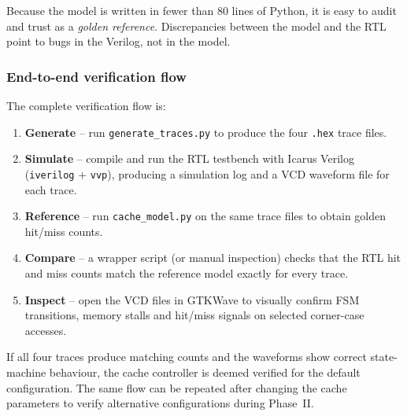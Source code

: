Because the model is written in fewer than 80 lines of Python, it is easy
to audit and trust as a \emph{golden reference}.  Discrepancies between
the model and the RTL point to bugs in the Verilog, not in the model.

\subsubsection{End-to-end verification flow}
The complete verification flow is:
\begin{enumerate}
  \item \textbf{Generate} -- run \texttt{generate\_traces.py} to produce
        the four \texttt{.hex} trace files.
  \item \textbf{Simulate} -- compile and run the RTL testbench with Icarus
        Verilog (\texttt{iverilog} + \texttt{vvp}), producing a simulation
        log and a VCD waveform file for each trace.
  \item \textbf{Reference} -- run \texttt{cache\_model.py} on the same
        trace files to obtain golden hit/miss counts.
  \item \textbf{Compare} -- a wrapper script (or manual inspection)
        checks that the RTL hit and miss counts match the reference model
        exactly for every trace.
  \item \textbf{Inspect} -- open the VCD files in GTKWave to visually
        confirm FSM transitions, memory stalls and hit/miss signals on
        selected corner-case accesses.
\end{enumerate}

If all four traces produce matching counts and the waveforms show correct
state-machine behaviour, the cache controller is deemed verified for the
default configuration.  The same flow can be repeated after changing the
cache parameters to verify alternative configurations during Phase~II.


